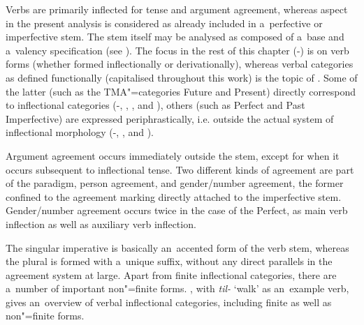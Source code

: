 Verbs are primarily inflected for tense and argument agreement, whereas aspect in the present analysis is considered as already included in a~perfective or imperfective stem. The stem itself may be analysed as composed of a~base and a~valency specification (see ). The focus in the rest of this chapter (-) is on verb forms (whether formed inflectionally or derivationally), whereas verbal categories as defined functionally (capitalised throughout this work) is the topic of . Some of the latter (such as the TMA"=categories Future and Present) directly correspond to inflectional categories (-, , , and ), others (such as Perfect and Past Imperfective) are expressed periphrastically, i.e. outside the actual system of inflectional morphology (-, , and ). 


Argument agreement occurs immediately outside the stem, except for when it occurs subsequent to inflectional tense. Two different kinds of agreement are part of the paradigm, person agreement, and gender/number agreement, the former confined to the agreement marking directly attached to the imperfective stem. Gender/number agreement occurs twice in the case of the Perfect, as main verb inflection as well as auxiliary verb inflection. 


The singular imperative is basically an~accented form of the verb stem, whereas the plural is formed with a~unique suffix, without any direct parallels in the agreement system at large. Apart from finite inflectional categories, there are a~number of important non"=finite forms. , with \textit{til-} `walk' as an~example verb, gives an~overview of verbal inflectional categories, including finite as well as non"=finite forms.


